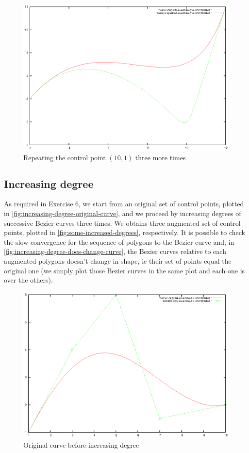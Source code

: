 \documentclass{article}
\begin{document}
\begin{figure}[h!]
  \centering
  \includegraphics{bezier-deCasteljau-curves/exercise-five}
  \caption{Repeating the control point $(10,1)$ three more times}
  \label{fig:repeating-same-control-point}
\end{figure}

\subsection{Increasing degree}
As required in Exercise 6, we start from an original set of control
points, plotted in \autoref{fig:increasing-degree-original-curve}, and
we proceed by increasing degrees of successive Bezier curves three times.
We obtains three augmented set of control points, plotted in
\autoref{fig:some-increased-degrees}, respectively. It is possible to
check the slow convergence for the sequence of polygons to the Bezier
curve and, in \autoref{fig:increasing-degree-does-change-curve}, the
Bezier curves relative to each augmented polygons doesn't change in
shape, ie their set of points equal the original one (we simply plot
those Bezier curves in the same plot and each one is over the others).

\begin{figure}[h!]
  \centering
  \includegraphics{bezier-deCasteljau-curves/exercise-six-original}
  \caption{Original curve before increasing degree}
  \label{fig:increasing-degree-original-curve}
\end{figure}
\end{document}
